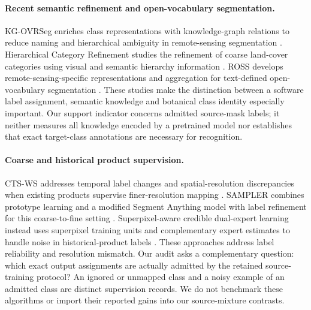 \paragraph{Recent semantic refinement and open-vocabulary segmentation.}
KG-OVRSeg enriches class representations with knowledge-graph relations to reduce naming and hierarchical ambiguity in remote-sensing segmentation \citep{huang2026kgovrseg}. Hierarchical Category Refinement studies the refinement of coarse land-cover categories using visual and semantic hierarchy information \citep{xiong2026hcr}. ROSS develops remote-sensing-specific representations and aggregation for text-defined open-vocabulary segmentation \citep{zhang2026ross}. These studies make the distinction between a software label assignment, semantic knowledge and botanical class identity especially important. Our support indicator concerns admitted source-mask labels; it neither measures all knowledge encoded by a pretrained model nor establishes that exact target-class annotations are necessary for recognition.

\paragraph{Coarse and historical product supervision.}
CTS-WS addresses temporal label changes and spatial-resolution discrepancies when existing products supervise finer-resolution mapping \citep{ctsws2025}. SAMPLER combines prototype learning and a modified Segment Anything model with label refinement for this coarse-to-fine setting \citep{sampler2025}. Superpixel-aware credible dual-expert learning instead uses superpixel training units and complementary expert estimates to handle noise in historical-product labels \citep{dualexpert2025}. These approaches address label reliability and resolution mismatch. Our audit asks a complementary question: which exact output assignments are actually admitted by the retained source-training protocol? An ignored or unmapped class and a noisy example of an admitted class are distinct supervision records. We do not benchmark these algorithms or import their reported gains into our source-mixture contrasts.


